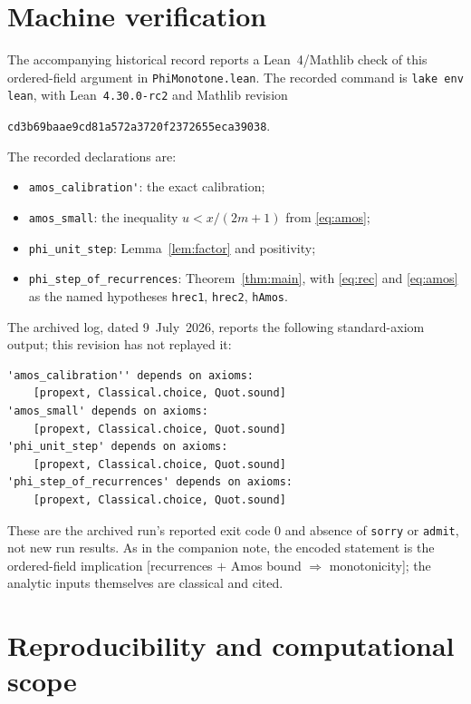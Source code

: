 \documentclass[11pt]{article}
\theoremstyle{remark}
\begin{document}
\section{Machine verification}

The accompanying historical record reports a Lean~4/Mathlib check of
this ordered-field argument in \nolinkurl{PhiMonotone.lean}. The recorded
command is \texttt{lake env lean}, with Lean~\texttt{4.30.0-rc2} and
Mathlib revision
\begin{center}\small
\nolinkurl{cd3b69baae9cd81a572a3720f2372655eca39038}.
\end{center}
The recorded declarations are:
\begin{itemize}
\item \nolinkurl{amos_calibration'}: the exact calibration;
\item \nolinkurl{amos_small}: the inequality $u<x/(2m+1)$ from
\eqref{eq:amos};
\item \nolinkurl{phi_unit_step}: Lemma~\ref{lem:factor} and positivity;
\item \nolinkurl{phi_step_of_recurrences}: Theorem~\ref{thm:main}, with
\eqref{eq:rec} and \eqref{eq:amos} as the named hypotheses
\texttt{hrec1}, \texttt{hrec2}, \texttt{hAmos}.
\end{itemize}
The archived log, dated 9~July~2026, reports the following standard-axiom
output; this revision has not replayed it:
\begin{verbatim}
'amos_calibration'' depends on axioms:
    [propext, Classical.choice, Quot.sound]
'amos_small' depends on axioms:
    [propext, Classical.choice, Quot.sound]
'phi_unit_step' depends on axioms:
    [propext, Classical.choice, Quot.sound]
'phi_step_of_recurrences' depends on axioms:
    [propext, Classical.choice, Quot.sound]
\end{verbatim}
These are the archived run's reported exit code $0$ and absence of
\texttt{sorry} or \texttt{admit}, not new run results. As in the
companion note, the encoded statement is the ordered-field
implication [recurrences $+$ Amos bound $\Rightarrow$ monotonicity];
the analytic inputs themselves are classical and cited.

\section{Reproducibility and computational scope}
\end{document}
